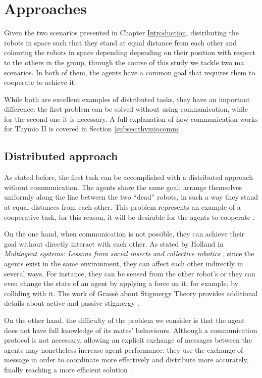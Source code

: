 \section{Approaches}
\label{sec:approaches}
Given the two scenarios presented in Chapter \hyperref[chap:intro]{Introduction}, 
distributing the robots in space such that they stand at equal distance from each 
other and colouring the robots in space depending depending on their position 
with respect to the others in the group, through the course of this study we tackle 
two \gls{ma} scenarios. In both of them, the agents have a common goal that 
requires them to cooperate to achieve it. 

While both are excellent examples of distributed tasks, they have an important 
difference: the first problem can be solved without using communication, while 
for the second one it is necessary.
A full explanation of how communication works for Thymio II is covered in 
Section \ref{subsec:thymiocomm}.

\subsection{Distributed approach}
\label{subsec:dist}

As stated before, the first task can be accomplished with a distributed approach 
without communication.
The agents share the same goal: arrange themselves uniformly along the line 
between the two “dead” robots, in such a way they stand at equal distances from 
each other.
This problem represents an example of a cooperative task, for this reason, it will 
be desirable for the agents to cooperate \cite[][]{barrett2017making}. 

On the one hand, when communication is not possible, they can achieve their 
goal without directly interact with each other. 
As stated by Holland in \emph{Multiagent systems: Lessons from social insects and 
collective robotics} \cite[][]{holland1996multiagent}, since the agents exist in the 
same environment, they can affect each other indirectly in several ways.
For instance, they can be sensed from the other robot’s or they can even change 
the state of an agent by applying a force on it, for example, by colliding with it.
The work of Grassè about Stigmergy Theory provides additional details about 
active and passive stigmergy \cite[][]{grasse1959reconstruction}.

On the other hand, the difficulty of the problem we consider is that the agent 
does not have full knowledge of its mates’ behaviours.
Although a communication protocol is not necessary, allowing an explicit 
exchange of messages between the agents may nonetheless increase agent 
performance: they use the exchange of message in order to coordinate more 
effectively and distribute more accurately, finally reaching a more efficient 
solution \cite[][]{panait2005cooperative}.

